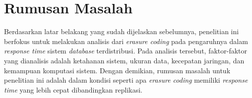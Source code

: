 \section{Rumusan Masalah}
\label{sec:rumusan-masalah}

Berdasarkan latar belakang yang sudah dijelaskan sebelumnya, penelitian ini berfokus untuk melakukan analisis dari \textit{erasure coding} pada pengaruhnya dalam \textit{response time} sistem \textit{database} terdistribusi. Pada analisis tersebut, faktor-faktor yang dianalisis adalah ketahanan sistem, ukuran data, kecepatan jaringan, dan kemampuan komputasi sistem. Dengan demikian, rumusan masalah untuk penelitian ini adalah dalam kondisi seperti apa \textit{erasure coding} memiliki \textit{response time} yang lebih cepat dibandingkan replikasi.
